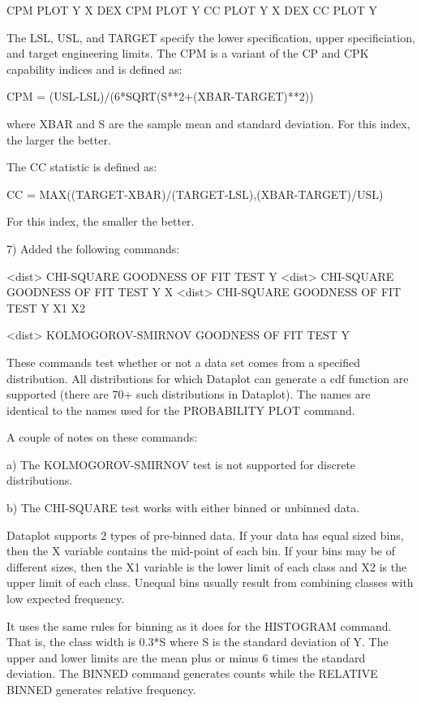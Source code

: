 {       CPM PLOT Y X
       DEX CPM PLOT Y
       CC PLOT Y X
       DEX CC PLOT Y

    The LSL, USL, and TARGET specify the lower specification,
    upper specificiation, and target engineering limits.  The
    CPM is a variant of the CP and CPK capability indices and
    is defined as:

      CPM = (USL-LSL)/(6*SQRT(S**2+(XBAR-TARGET)**2))

    where XBAR and S are the sample mean and standard deviation.
    For this index, the larger the better.

    The CC statistic is defined as:

      CC = MAX((TARGET-XBAR)/(TARGET-LSL),(XBAR-TARGET)/USL)

    For this index, the smaller the better.

 7) Added the following commands:

       <dist> CHI-SQUARE GOODNESS OF FIT TEST Y
       <dist> CHI-SQUARE GOODNESS OF FIT TEST Y X
       <dist> CHI-SQUARE GOODNESS OF FIT TEST Y X1 X2

       <dist> KOLMOGOROV-SMIRNOV GOODNESS OF FIT TEST Y

    These commands test whether or not a data set
    comes from a specified distribution.  All distributions for
    which Dataplot can generate a cdf function are supported (there
    are 70+ such distributions in Dataplot).  The names are identical
    to the names used for the PROBABILITY PLOT command.

    A couple of notes on these commands:

    a) The KOLMOGOROV-SMIRNOV test is not supported for discrete
       distributions.

    b) The CHI-SQUARE test works with either binned or unbinned
       data.

       Dataplot supports 2 types of pre-binned data.  If your data
       has equal sized bins, then the X variable contains the
       mid-point of each bin.  If your bins may be of different
       sizes, then the X1 variable is the lower limit of each
       class and X2 is the upper limit of each class.  Unequal
       bins usually result from combining classes with low expected
       frequency.  

       It uses the same rules for binning as it does for the
       HISTOGRAM command.  That is, the class width is 0.3*S where S
       is the standard deviation of Y.  The upper and lower limits are
       the mean plus or minus 6 times the standard deviation.
       The BINNED command generates counts while the RELATIVE BINNED
       generates relative frequency.
   
}
